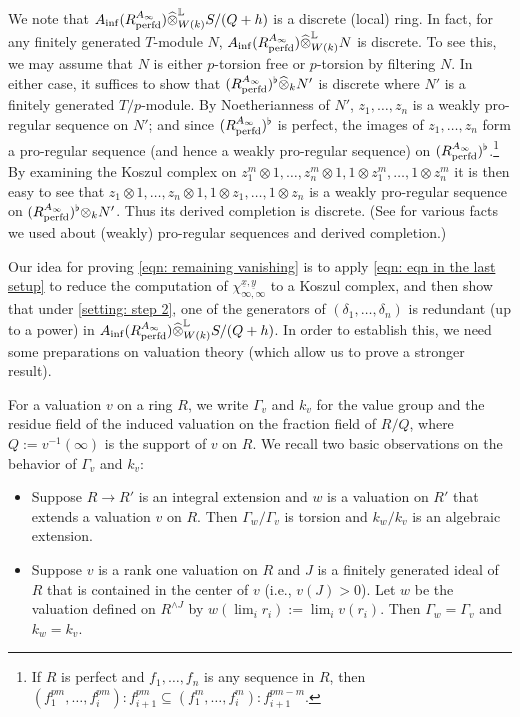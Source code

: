 \documentclass[12pt]{amsart}
\numberwithin{equation}{theorem}
\numberwithin{equation}{theorem}
\newcommand{\perfd}{\textnormal{perfd}}
\begin{document}
\begin{remark}
We note that $A_{\inf}(R^{A_\infty}_\perfd) \widehat{\otimes}^\myL_{W(k)}S/(Q+h)$ is a discrete (local) ring. In fact, for any finitely generated $T$-module $N$, $A_{\inf}(R^{A_\infty}_\perfd) \widehat{\otimes}^\myL_{W(k)} N$ is discrete. To see this, we may assume that $N$ is either $p$-torsion free or $p$-torsion by filtering $N$. In either case, it suffices to show that $(R^{A_\infty}_\perfd)^\flat\widehat{\otimes}_k N'$ is discrete where $N'$ is a finitely generated $T/p$-module. By Noetherianness of $N'$, $z_1,\dots,z_n$ is a weakly pro-regular sequence on $N'$; and since $(R^{A_\infty}_\perfd)^\flat$ is perfect, the images of $z_1,\dots,z_n$ form a pro-regular sequence (and hence a weakly pro-regular sequence) on $(R^{A_\infty}_\perfd)^\flat$.\footnote{If $R$ is perfect and $f_1,\dots,f_n$ is any sequence in $R$, then $(f_1^{pm},\dots,f_i^{pm}):f_{i+1}^{pm}\subseteq (f_1^m,\dots,f_i^m):f_{i+1}^{pm-m}$.} By examining the Koszul complex on $z^m_1\otimes1,\dots, z^m_n\otimes 1, 1\otimes z^m_1,\dots,1\otimes z^m_n$ it is then easy to see that $z_1\otimes1,\dots, z_n\otimes 1, 1\otimes z_1,\dots,1\otimes z_n$ is a weakly pro-regular sequence on $(R^{A_\infty}_\perfd)^\flat{\otimes}_k N'$. Thus its derived completion is discrete. (See \cite{SchenzelProregularSequences2003} for various facts we used about (weakly) pro-regular sequences and derived completion.)
\end{remark}

Our idea for proving \autoref{eqn: remaining vanishing} is to apply \autoref{eqn: eqn in the last setup} to reduce the computation of $\chi_{\infty,\infty}^{\underline{x},\underline{y}}$ to a Koszul complex, and then show that under \autoref{setting: step 2}, one of the generators of $(\delta_1,\dots,\delta_n)$ is redundant (up to a power) in $A_{\inf}(R^{A_\infty}_\perfd) \widehat{\otimes}^\myL_{W(k)} S/(Q+h)$. In order to establish this, we need some preparations on valuation theory (which allow us to prove a stronger result).

For a valuation $v$ on a ring $R$, we write $\Gamma_v$ and $k_v$ for the value group and the residue field of the induced valuation on the fraction field of $R/Q$, where $Q:= v^{-1}(\infty)$ is the support of $v$ on $R$. We recall two basic observations on the behavior of $\Gamma_v$ and $k_v$: %
\begin{itemize}
    \item Suppose $R\to R'$ is an integral extension and $w$ is a valuation on $R'$ that extends a valuation $v$ on $R$. Then $\Gamma_w/\Gamma_v$ is torsion and $k_w/k_v$ is an algebraic extension.
    \item Suppose $v$ is a rank one valuation on $R$ and $J$ is a finitely generated ideal of $R$ that is contained in the center of $v$ (i.e., $v(J)>0$). Let $w$ be the valuation defined on $R^{\wedge J}$ by $w(\lim_i r_i):= \lim_i v(r_i)$. Then $\Gamma_w=\Gamma_v$ and $k_w=k_v$. 
\end{itemize}
\end{document}
